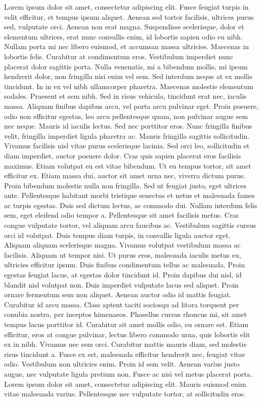 \documentclass[twoside,a4paper]{article}
\begin{document}
\begin{simple}
Lorem ipsum dolor sit amet, consectetur adipiscing elit. Fusce feugiat turpis in velit efficitur, et tempus ipsum aliquet. Aenean sed tortor facilisis, ultrices purus sed, vulputate orci. Aenean non erat magna. Suspendisse scelerisque, dolor et elementum ultrices, erat nunc convallis enim, id lobortis sapien odio eu nibh. Nullam porta mi nec libero euismod, et accumsan massa ultricies. Maecenas in lobortis felis. Curabitur at condimentum eros. Vestibulum imperdiet nunc placerat dolor sagittis porta. Nulla venenatis, mi a bibendum mollis, mi ipsum hendrerit dolor, non fringilla nisi enim vel sem. Sed interdum neque at ex mollis tincidunt. In in ex vel nibh ullamcorper pharetra. Maecenas molestie elementum sodales. Praesent et sem nibh. Sed in risus vehicula, tincidunt erat nec, iaculis massa. Aliquam finibus dapibus arcu, vel porta arcu pulvinar eget. Proin posuere, odio non efficitur egestas, leo arcu pellentesque quam, non pulvinar augue sem nec neque.
Mauris id iaculis lectus. Sed nec porttitor eros. Nunc fringilla finibus velit, fringilla imperdiet ligula pharetra ac. Mauris fringilla sagittis sollicitudin. Vivamus facilisis nisl vitae purus scelerisque lacinia. Sed orci leo, sollicitudin et diam imperdiet, auctor posuere dolor. Cras quis sapien placerat eros facilisis maximus. Etiam volutpat eu est vitae bibendum. Ut eu tempus tortor, sit amet efficitur ex. Etiam massa dui, auctor sit amet urna nec, viverra dictum purus. Proin bibendum molestie nulla non fringilla. Sed ut feugiat justo, eget ultrices ante. Pellentesque habitant morbi tristique senectus et netus et malesuada fames ac turpis egestas.
Duis sed dictum lectus, ac commodo dui. Nullam interdum felis sem, eget eleifend odio tempor a. Pellentesque sit amet facilisis metus. Cras congue vulputate tortor, vel aliquam arcu faucibus ac. Vestibulum sagittis cursus orci id volutpat. Duis tempus diam turpis, in convallis ligula auctor eget. Aliquam aliquam scelerisque magna. Vivamus volutpat vestibulum massa ac facilisis. Aliquam ut tempor nisi. Ut purus eros, malesuada iaculis metus eu, ultricies efficitur ipsum. Duis finibus condimentum tellus ac malesuada.
Proin egestas feugiat lacus, at egestas dolor tincidunt id. Proin dapibus dui nisl, id blandit nisl volutpat non. Duis imperdiet vulputate lacus sed aliquet. Proin ornare fermentum sem non aliquet. Aenean auctor odio id mattis feugiat. Curabitur id arcu massa. Class aptent taciti sociosqu ad litora torquent per conubia nostra, per inceptos himenaeos. Phasellus cursus rhoncus mi, sit amet tempus lacus porttitor id. Curabitur sit amet mollis odio, eu ornare est. Etiam efficitur, eros at congue pulvinar, lectus libero commodo urna, quis lobortis elit ex in nibh. Vivamus nec sem orci.
Curabitur mattis mauris diam, sed molestie risus tincidunt a. Fusce ex est, malesuada efficitur hendrerit nec, feugiat vitae odio. Vestibulum non ultricies enim. Proin id sem velit. Aenean varius justo augue, nec vulputate ligula pretium non. Fusce ac nisi vel metus placerat porta. Lorem ipsum dolor sit amet, consectetur adipiscing elit. Mauris euismod enim vitae malesuada varius. Pellentesque nec vulputate tortor, at sollicitudin eros.
\end{simple}
\end{document}
